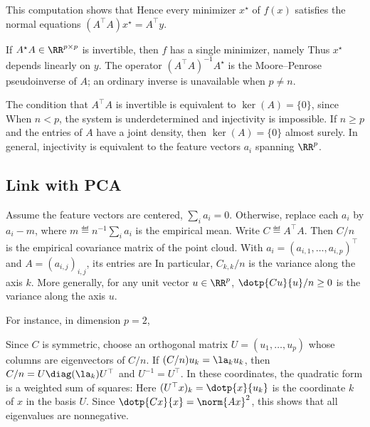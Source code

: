 This computation shows that
Hence every minimizer $x^\star$ of $f(x)$ satisfies the normal equations $(A^\top A) x^\star = A^\top y$.
 
If $A^\star A \in \RR^{p \times p}$ is invertible, then $f$ has a single minimizer, namely  
Thus $x^\star$ depends linearly on $y$. The operator $(A^\top A)^{-1} A^\star$ is the Moore--Penrose pseudoinverse of $A$; an ordinary inverse is unavailable when $p \neq n$.
 
The condition that $A^\top A$ is invertible is equivalent to $\ker(A)=\{0\}$, since 
When $n<p$, the system is underdetermined and injectivity is impossible. If $n\geq p$ and the entries of $A$ have a joint density, then $\ker(A)=\{0\}$ almost surely. In general, injectivity is equivalent to the feature vectors $a_i$ spanning $\RR^p$.
 
                                                                                  
\subsection{Link with PCA}

Assume the feature vectors are centered, $\sum_i a_i=0$. Otherwise, replace each $a_i$ by $a_i-m$, where $m\eqdef n^{-1}\sum_i a_i$ is the empirical mean. Write $C\eqdef A^\top A$. Then $C/n$ is the empirical covariance matrix of the point cloud. With $a_i=(a_{i,1},\ldots,a_{i,p})^\top$ and $A=(a_{i,j})_{i,j}$, its entries are
 In particular, $C_{k,k}/n$ is the variance along the axis $k$. More generally, for any unit vector $u \in \RR^p$, $\dotp{C u}{u}/n \geq 0$ is the variance along the axis $u$.
 
For instance, in dimension $p=2$, 

Since $C$ is symmetric, choose an orthogonal matrix $U=(u_1,\ldots,u_p)$ whose columns are eigenvectors of $C/n$. If $(C/n)u_k=\la_k u_k$, then $C/n=U\diag(\la_k)U^\top$ and $U^{-1}=U^\top$. In these coordinates, the quadratic form is a weighted sum of squares:
Here $( U^\top x )_k = \dotp{x}{u_k}$ is the coordinate $k$ of $x$ in the basis $U$. Since $\dotp{Cx}{x}=\norm{Ax}^2$, this shows that all eigenvalues are nonnegative.

